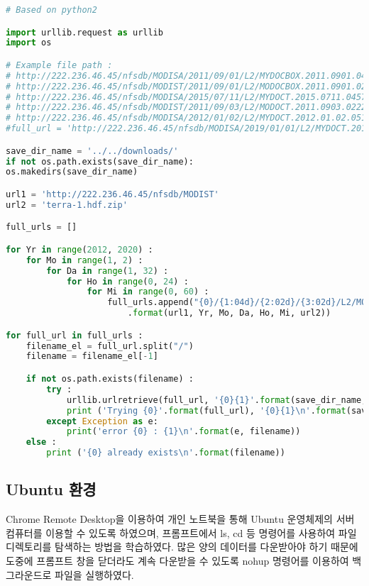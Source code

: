 \begin{lstlisting}[language=python]
# Based on python2

import urllib.request as urllib
import os

# Example file path : 
# http://222.236.46.45/nfsdb/MODISA/2011/09/01/L2/MYDOCBOX.2011.0901.0413.aqua-1.hdf.zip
# http://222.236.46.45/nfsdb/MODIST/2011/09/01/L2/MODOCBOX.2011.0901.0235.terra-1.hdf.zip
# http://222.236.46.45/nfsdb/MODISA/2015/07/11/L2/MYDOCT.2015.0711.0457.aqua-1.hdf.zip
# http://222.236.46.45/nfsdb/MODIST/2011/09/03/L2/MODOCT.2011.0903.0222.terra-1.hdf.zip
# http://222.236.46.45/nfsdb/MODISA/2012/01/02/L2/MYDOCT.2012.01.02.0510.aqua-1.hdf.zip
#full_url = 'http://222.236.46.45/nfsdb/MODISA/2019/01/01/L2/MYDOCT.2019.0101.0000.aqua-1.hdf.zip'

save_dir_name = '../../downloads/'
if not os.path.exists(save_dir_name):
os.makedirs(save_dir_name)

url1 = 'http://222.236.46.45/nfsdb/MODIST'
url2 = 'terra-1.hdf.zip'

full_urls = []

for Yr in range(2012, 2020) :
	for Mo in range(1, 2) :
		for Da in range(1, 32) :
			for Ho in range(0, 24) :
				for Mi in range(0, 60) :
					full_urls.append("{0}/{1:04d}/{2:02d}/{3:02d}/L2/MODOCT.{1:04d}.{2:02d}{3:02d}.{4:02d}{5:02d}.{6}"\
						.format(url1, Yr, Mo, Da, Ho, Mi, url2))

for full_url in full_urls : 
	filename_el = full_url.split("/")
	filename = filename_el[-1]

	if not os.path.exists(filename) :
		try :
			urllib.urlretrieve(full_url, '{0}{1}'.format(save_dir_name, filename))
			print ('Trying {0}'.format(full_url), '{0}{1}\n'.format(save_dir_name, filename))
		except Exception as e: 
			print('error {0} : {1}\n'.format(e, filename))
	else :
		print ('{0} already exists\n'.format(filename))

\end{lstlisting}

\subsection{Ubuntu 환경}
Chrome Remote Desktop을 이용하여 개인 노트북을 통해 Ubuntu 운영체제의 서버 컴퓨터를 이용할 수 있도록 하였으며, 프롬프트에서 ls, cd 등 명령어를 사용하여 파일 디렉토리를 탐색하는 방법을 학습하였다. 많은 양의 데이터를 다운받아야 하기 때문에 도중에 프롬프트 창을 닫더라도 계속 다운받을 수 있도록 nohup 명령어를 이용하여 백그라운드로 파일을 실행하였다. 



